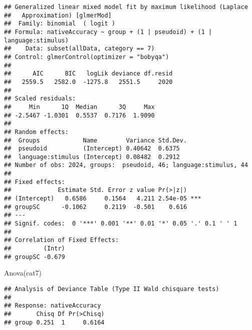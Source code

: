 \documentclass[
]{article}
\newenvironment{Shaded}{\begin{snugshade}}{\end{snugshade}}
\newcommand{\AttributeTok}[1]{\textcolor[rgb]{0.77,0.63,0.00}{#1}}
\newcommand{\DecValTok}[1]{\textcolor[rgb]{0.00,0.00,0.81}{#1}}
\newcommand{\FunctionTok}[1]{\textcolor[rgb]{0.00,0.00,0.00}{#1}}
\newcommand{\NormalTok}[1]{#1}
\newcommand{\OtherTok}[1]{\textcolor[rgb]{0.56,0.35,0.01}{#1}}
\newcommand{\SpecialCharTok}[1]{\textcolor[rgb]{0.00,0.00,0.00}{#1}}
\newcommand{\StringTok}[1]{\textcolor[rgb]{0.31,0.60,0.02}{#1}}
\begin{document}
\begin{verbatim}
## Generalized linear mixed model fit by maximum likelihood (Laplace
##   Approximation) [glmerMod]
##  Family: binomial  ( logit )
## Formula: nativeAccuracy ~ group + (1 | pseudoid) + (1 | language:stimulus)
##    Data: subset(allData, category == 7)
## Control: glmerControl(optimizer = "bobyqa")
## 
##      AIC      BIC   logLik deviance df.resid 
##   2559.5   2582.0  -1275.8   2551.5     2020 
## 
## Scaled residuals: 
##     Min      1Q  Median      3Q     Max 
## -2.5467 -1.0301  0.5537  0.7176  1.9090 
## 
## Random effects:
##  Groups            Name        Variance Std.Dev.
##  pseudoid          (Intercept) 0.40642  0.6375  
##  language:stimulus (Intercept) 0.08482  0.2912  
## Number of obs: 2024, groups:  pseudoid, 46; language:stimulus, 44
## 
## Fixed effects:
##             Estimate Std. Error z value Pr(>|z|)    
## (Intercept)   0.6586     0.1564   4.211 2.54e-05 ***
## groupSC      -0.1062     0.2119  -0.501    0.616    
## ---
## Signif. codes:  0 '***' 0.001 '**' 0.01 '*' 0.05 '.' 0.1 ' ' 1
## 
## Correlation of Fixed Effects:
##         (Intr)
## groupSC -0.679
\end{verbatim}

\begin{Shaded}
\begin{Highlighting}[]
\FunctionTok{Anova}\NormalTok{(cat7)}
\end{Highlighting}
\end{Shaded}

\begin{verbatim}
## Analysis of Deviance Table (Type II Wald chisquare tests)
## 
## Response: nativeAccuracy
##       Chisq Df Pr(>Chisq)
## group 0.251  1     0.6164
\end{verbatim}

\begin{Shaded}
\end{Shaded}
\end{document}
